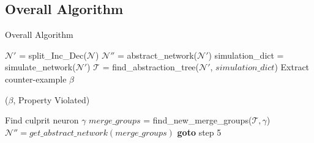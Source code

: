 

\subsection{Overall Algorithm}
\begin{algorithm}[H]
    \caption{Overall Algorithm}
    \label{Overall Algorithm}
    \begin{algorithmic}[1]
        \State $\mathcal{N'}$ = split\_Inc\_Dec($\mathcal{N}$)
        \State $\mathcal{N''}$ = abstract\_network($\mathcal{N'}$)
        \State simulation\_dict = simulate\_network($\mathcal{N'}$)
        \State $\mathcal{T}$ = find\_abstraction\_tree($\mathcal{N'}$, $simulation\_dict$)
        \Else
            \State Extract counter-example $\beta$
            {

                \Return ($\beta$, Property Violated)
            }
            \Else
                \State Find culprit neuron $\gamma$
                \State $merge\_groups$ = find\_new\_merge\_groups($\mathcal{T, \gamma}$)
                \State $\mathcal{N''} = get\_abstract\_network(merge\_groups)$
                \State \textbf{goto} step 5
            \EndIf
        \EndIf
    \end{algorithmic}
\end{algorithm}

